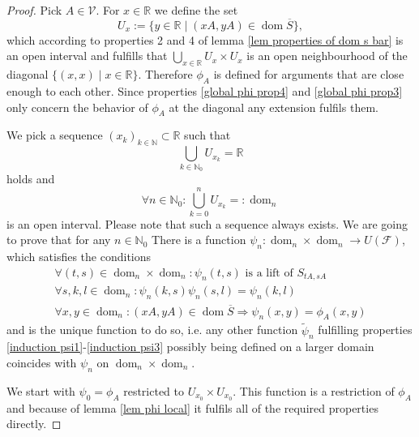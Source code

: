 \documentclass[b5paper,draft,openbib,12pt]{memoir}
\DeclareMathOperator{\dom}{dom}
\begin{document}
\begin{proof}
Pick \(A\in\mathcal{V}\). For \(x\in\mathbb{R}\) we define the set
\begin{equation}\label{def U x}
U_x:=\{y\in\mathbb{R}\mid (x A, y A)\in \dom\overline{S}\},
\end{equation}
which according to properties 2 and 4 of lemma 
\ref{lem properties of dom s bar} is an open interval and
fulfills that \(\bigcup_{x\in\mathbb{R}} U_x\times U_x\) is an open 
neighbourhood of the diagonal \(\{(x,x)\mid x \in\mathbb{R}\}\).
Therefore \(\phi_A\) is defined for arguments that are
close enough to each other. Since 
properties \eqref{global phi prop4} and \eqref{global phi prop3} 
only concern the behavior of \(\phi_A\) at the diagonal any
extension fulfils them. 

We pick a sequence \((x_k)_{k\in\mathbb{N}}\subset \mathbb{R}\) such
that 
\begin{equation}\label{open cover of R}
\bigcup_{k\in\mathbb{N}_0} U_{x_k} = \mathbb{R}
\end{equation}
holds and 
\begin{equation}
  \forall n \in \mathbb{N}_0: \bigcup_{k=0}^n U_{x_k}=:\dom_n
\end{equation}
is an open interval. Please note that such a sequence always exists. 
We are going to prove that for any \(n\in\mathbb{N}_0\) 
There is a function \(\psi_n:\dom_n\times\dom_n\to U(\mathcal{F})\), 
which satisfies the conditions
\begin{align}\label{induction psi1}
\forall (t,s)\in \dom_n\times \dom_n: \psi_n(t,s) \text{ is a lift of } S_{tA, sA}\\\label{induction psi2}
\forall s,k,l\in\dom_n: \psi_n(k,s)\psi_n(s,l)=\psi_n(k,l)\\\label{induction psi3}
\forall x,y\in\dom_n: (xA, yA)\in\dom\overline{S}\Rightarrow  \psi_n(x,y)=\phi_A(x,y)
\end{align}
and is the unique function to do so, i.e. 
any other function \(\tilde{\psi}_{n}\) fulfilling properties 
\eqref{induction psi1}-\eqref{induction psi3} possibly being defined
on a larger domain coincides with \(\psi_n\) on \(\dom_n\times\dom_n\).

We start with \(\psi_0=\phi_A\)  
restricted to \(U_{x_0} \times U_{x_0}\).
This function is a restriction of \(\phi_A\) and because of 
lemma \ref{lem phi local} it 
fulfils all of the required properties directly. 
 

\end{proof}
\end{document}
